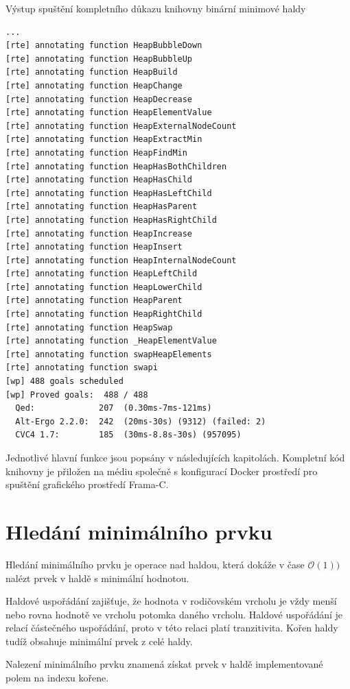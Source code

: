 \begin{listing}[H]
	\caption{Výstup spuštění kompletního důkazu knihovny binární minimové haldy}
	\label{shell:run-frama-c-proofs-output}
	\begin{verbatim}
...
[rte] annotating function HeapBubbleDown
[rte] annotating function HeapBubbleUp
[rte] annotating function HeapBuild
[rte] annotating function HeapChange
[rte] annotating function HeapDecrease
[rte] annotating function HeapElementValue
[rte] annotating function HeapExternalNodeCount
[rte] annotating function HeapExtractMin
[rte] annotating function HeapFindMin
[rte] annotating function HeapHasBothChildren
[rte] annotating function HeapHasChild
[rte] annotating function HeapHasLeftChild
[rte] annotating function HeapHasParent
[rte] annotating function HeapHasRightChild
[rte] annotating function HeapIncrease
[rte] annotating function HeapInsert
[rte] annotating function HeapInternalNodeCount
[rte] annotating function HeapLeftChild
[rte] annotating function HeapLowerChild
[rte] annotating function HeapParent
[rte] annotating function HeapRightChild
[rte] annotating function HeapSwap
[rte] annotating function _HeapElementValue
[rte] annotating function swapHeapElements
[rte] annotating function swapi
[wp] 488 goals scheduled
[wp] Proved goals:  488 / 488
  Qed:             207  (0.30ms-7ms-121ms)
  Alt-Ergo 2.2.0:  242  (20ms-30s) (9312) (failed: 2)
  CVC4 1.7:        185  (30ms-8.8s-30s) (957095)
	\end{verbatim}
\end{listing}

Jednotlivé hlavní funkce jsou popsány v následujících kapitolách. Kompletní kód knihovny je přiložen na médiu společně s konfigurací Docker prostředí pro spuštění grafického prostředí Frama-C.

\section{Hledání minimálního prvku}
\label{subsec:HeapFindMin}

Hledání minimálního prvku je operace nad haldou, která dokáže v čase $\mathcal{O}(1))$ nalézt prvek v haldě s minimální hodnotou.

Haldové uspořádání zajišťuje, že hodnota v rodičovském vrcholu je vždy menší nebo rovna hodnotě ve vrcholu potomka daného vrcholu. Haldové uspořádání je relací částečného uspořádání, proto v této relaci platí tranzitivita. Kořen haldy tudíž obsahuje minimální prvek z celé haldy.

Nalezení minimálního prvku znamená získat prvek v haldě implementované polem na indexu kořene.

